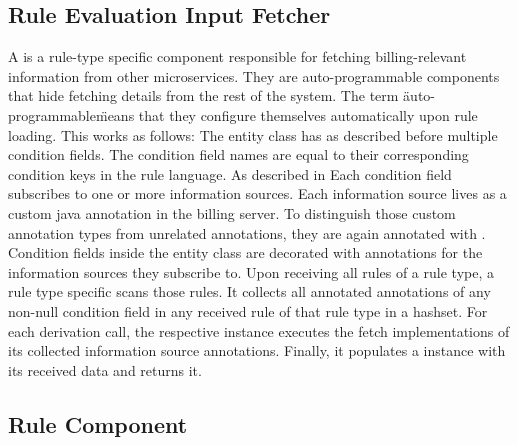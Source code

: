 \subsection{Rule Evaluation Input Fetcher}\label{subsec:rule-evaluation-input-fetcher}
A  is a rule-type specific component responsible for fetching billing-relevant information from other \AV microservices.
They are auto-programmable components that hide fetching details from the rest of the system.
The term \"auto-programmable\" means that they configure themselves automatically upon rule loading.
This works as follows: The  entity class has as described before multiple condition fields.
The condition field names are equal to their corresponding condition keys in the rule language.
As described in \addref Each condition field subscribes to one or more information sources.
Each information source lives as a custom java annotation in the billing server.
To distinguish those custom annotation types from unrelated annotations, they are again annotated with .
Condition fields inside the  entity class are decorated with annotations for the information sources they subscribe to.
Upon receiving all rules of a rule type, a rule type specific  scans those rules.
It collects all  annotated annotations of any non-null condition field in any received rule of that rule type in a hashset.
For each derivation call, the respective  instance executes the fetch implementations of its collected information source annotations.
Finally, it populates a  instance with its received data and returns it.

\subsection{Rule Component}\label{subsec:rule-component}


